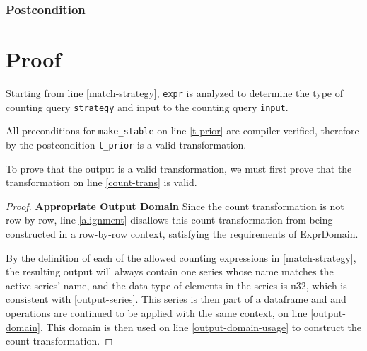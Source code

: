 \documentclass{article}
\begin{document}
\subsubsection*{Postcondition}

\section{Proof}
Starting from line \ref{match-strategy}, 
\texttt{expr} is analyzed to determine the type of counting query \texttt{strategy} and input to the counting query \texttt{input}.

All preconditions for \texttt{make\_stable} on line \ref{t-prior} are compiler-verified, 
therefore by the postcondition \texttt{t\_prior} is a valid transformation.

To prove that the output is a valid transformation, 
we must first prove that the transformation on line \ref{count-trans} is valid.

\begin{proof}
    \textbf{Appropriate Output Domain}
    Since the count transformation is not row-by-row, 
    line \ref{alignment} disallows this count transformation from being constructed in a row-by-row context,
    satisfying the requirements of ExprDomain.

    By the definition of each of the allowed counting expressions in \ref{match-strategy},
    the resulting output will always contain one series whose name matches the active series' name,
    and the data type of elements in the series is u32,
    which is consistent with \ref{output-series}.
    This series is then part of a dataframe and and operations are continued to be applied with the same context,
    on line \ref{output-domain}.    
    This domain is then used on line \ref{output-domain-usage} to construct the count transformation.
\end{proof}
\end{document}
